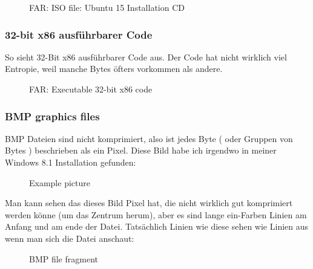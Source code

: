 \begin{figure}[H]
\centering
{}
\caption{FAR: ISO file: Ubuntu 15 Installation \ac{CD}}
\end{figure}

\clearpage
\subsubsection{32-bit x86 ausf\"uhrbarer Code} 

So sieht 32-Bit x86 ausf\"uhrbarer Code aus. 
Der Code hat nicht wirklich viel Entropie, weil manche Bytes \"ofters vorkommen als andere.

\begin{figure}[H]
\centering
{}
\caption{FAR: Executable 32-bit x86 code}
\end{figure}


\clearpage
\subsubsection{BMP graphics files}


BMP Dateien sind nicht komprimiert, also ist jedes Byte ( oder Gruppen von Bytes ) beschrieben als
ein Pixel. Diese Bild habe ich irgendwo in meiner Windows 8.1 Installation gefunden: 

\begin{figure}[H]
\centering
{}
\caption{Example picture}
\end{figure}

Man kann sehen das dieses Bild Pixel hat, die nicht wirklich gut komprimiert werden k\"onne (um das Zentrum herum),
aber es sind lange ein-Farben Linien am Anfang und am ende der Datei. Tats\"achlich Linien wie diese sehen wie Linien aus
wenn man sich die Datei anschaut:

\begin{figure}[H]
\centering
{}
\caption{BMP file fragment}
\end{figure}

